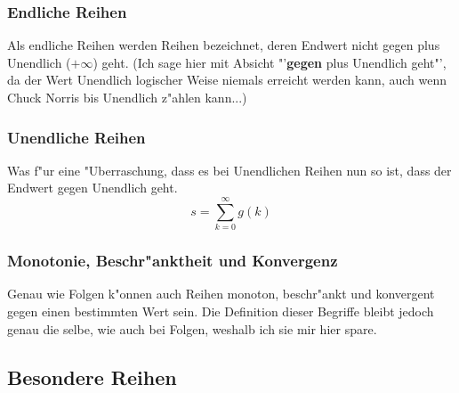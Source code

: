\subsubsection{Endliche Reihen}
Als endliche Reihen werden Reihen bezeichnet, deren Endwert nicht gegen plus Unendlich ($+\infty$) geht. (Ich sage hier mit Absicht "'\textbf{gegen} plus Unendlich geht"', da der Wert Unendlich logischer Weise niemals erreicht werden kann, auch wenn Chuck Norris bis Unendlich z"ahlen kann...)

\subsubsection{Unendliche Reihen}
Was f"ur eine "Uberraschung, dass es bei Unendlichen Reihen nun so ist, dass der Endwert gegen Unendlich geht.
\begin{equation*}
s = \sum\limits_{k=0}^{\infty}g(k)
\end{equation*}

\subsubsection{Monotonie, Beschr"anktheit und Konvergenz}
Genau wie Folgen k"onnen auch Reihen monoton, beschr"ankt und konvergent gegen einen bestimmten Wert sein. Die Definition dieser Begriffe bleibt jedoch genau die selbe, wie auch bei Folgen, weshalb ich sie mir hier spare.

\subsection{Besondere Reihen}
